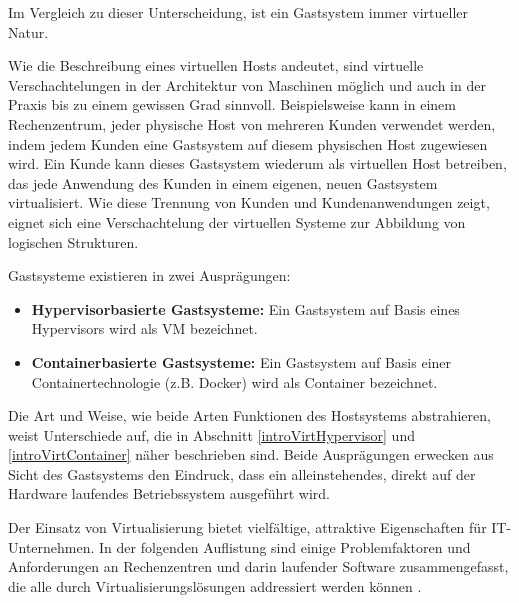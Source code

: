 \documentclass[../main.tex]{subfiles}
\begin{document}
		Im Vergleich zu dieser Unterscheidung, ist ein Gastsystem immer virtueller Natur.

		Wie die Beschreibung eines virtuellen Hosts andeutet, sind virtuelle Verschachtelungen in der Architektur von Maschinen möglich und auch in der Praxis bis zu einem gewissen Grad sinnvoll. Beispielsweise kann in einem Rechenzentrum, jeder physische Host von mehreren Kunden verwendet werden, indem jedem Kunden eine Gastsystem auf diesem physischen Host zugewiesen wird. Ein Kunde kann dieses Gastsystem wiederum als virtuellen Host betreiben, das jede Anwendung des Kunden in einem eigenen, neuen Gastsystem virtualisiert. Wie diese Trennung von Kunden und Kundenanwendungen zeigt, eignet sich eine Verschachtelung der virtuellen Systeme zur Abbildung von logischen Strukturen.

		Gastsysteme existieren in zwei Ausprägungen:
		\begin{itemize}
			\item \textbf{Hypervisorbasierte Gastsysteme:} Ein Gastsystem auf Basis eines Hypervisors wird als \acrshort{VM} bezeichnet.
			\item \textbf{Containerbasierte Gastsysteme:} Ein Gastsystem auf Basis einer Containertechnologie (z.B. Docker) wird als Container bezeichnet.
		\end{itemize}

		Die Art und Weise, wie beide Arten Funktionen des Hostsystems abstrahieren, weist Unterschiede auf, die in Abschnitt \ref{introVirtHypervisor} und \ref{introVirtContainer} näher beschrieben sind. Beide Ausprägungen erwecken aus Sicht des Gastsystems den Eindruck, dass ein alleinstehendes, direkt auf der Hardware laufendes Betriebssystem ausgeführt wird.

    Der Einsatz von Virtualisierung bietet vielfältige, attraktive Eigenschaften für \acrshort{IT}-Unternehmen. In der folgenden Auflistung sind einige Problemfaktoren und Anforderungen an Rechenzentren und darin laufender Software zusammengefasst, die alle durch Virtualisierungslösungen addressiert werden können \cite[S.1]{bsiVirt}\cite[S.662,672f.]{tanenbaumOS}\cite[S.299]{mandlOS}.
\end{document}
